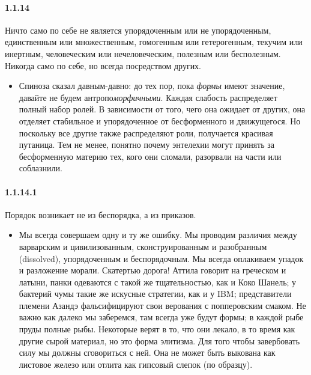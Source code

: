 \paragraph{1.1.14}\hypertarget{par:1.1.14}{} Ничто само по себе не является упорядоченным или не упорядоченным, единственным или множественным, гомогенным или гетерогенным, текучим или инертным, человеческим или нечеловеческим, полезным или бесполезным. Никогда само по себе, но всегда посредством других.
	\begin{itemize}
	\item Спиноза сказал давным-давно: до тех пор, пока {\itshape формы} имеют значение, давайте не будем антропо{\itshape{морфичными}}. Каждая слабость распределяет полный набор ролей. В зависимости от того, чего она ожидает от других, она отделяет стабильное и упорядоченное от бесформенного и движущегося. Но поскольку все другие также распределяют роли, получается красивая путаница. Тем не менее, понятно почему энтелехии могут принять за бесформенную материю тех, кого они сломали, разорвали на части или соблазнили.

	\end{itemize}

\paragraph{1.1.14.1} Порядок возникает не из беспорядка, а из приказов.
	\begin{itemize}
	\item Мы всегда совершаем одну и ту же ошибку. Мы проводим различия между варварским и цивилизованным, сконструированным и разобранным (dissolved), упорядоченным и беспорядочным. Мы всегда оплакиваем упадок и разложение морали. Скатертью дорога! Аттила говорит на греческом и латыни, панки одеваются с такой же тщательностью, как и Коко Шанель; у бактерий чумы такие же искусные стратегии, как и у IBM; представители племени Азандэ фальсифицируют свои верования с попперовским смаком. Не важно как далеко мы заберемся, там всегда уже будут формы; в каждой рыбе пруды полные рыбы. Некоторые верят в то, что они лекало, в то время как другие сырой материал, но это форма элитизма. Для того чтобы завербовать силу мы должны сговориться с ней. Она не может быть выкована как листовое железо или отлита как гипсовый слепок (по образцу).

	\end{itemize}

